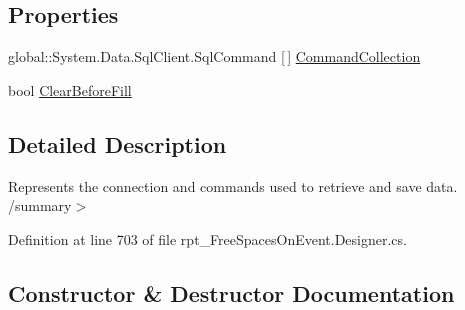 \subsection*{Properties}
\begin{DoxyCompactItemize}
\item 
global\+::\+System.\+Data.\+Sql\+Client.\+Sql\+Command \mbox{[}$\,$\mbox{]} \hyperlink{classprj_progra_i_i_i_1_1rpt___free_spaces_on_event_table_adapters_1_1rpt___free_spaces_on_event_table_adapter_aeb07de485c1ea74c03d2d044c1f8baab}{Command\+Collection}
\item 
bool \hyperlink{classprj_progra_i_i_i_1_1rpt___free_spaces_on_event_table_adapters_1_1rpt___free_spaces_on_event_table_adapter_ae1a00c339bd0fa24ace34b4b916b8c91}{Clear\+Before\+Fill}
\end{DoxyCompactItemize}


\subsection{Detailed Description}
Represents the connection and commands used to retrieve and save data. /summary$>$ 

Definition at line 703 of file rpt\+\_\+\+Free\+Spaces\+On\+Event.\+Designer.\+cs.



\subsection{Constructor \& Destructor Documentation}
\hypertarget{classprj_progra_i_i_i_1_1rpt___free_spaces_on_event_table_adapters_1_1rpt___free_spaces_on_event_table_adapter_a32a5f91416fc73ef5be530920866cb01}{}\label{classprj_progra_i_i_i_1_1rpt___free_spaces_on_event_table_adapters_1_1rpt___free_spaces_on_event_table_adapter_a32a5f91416fc73ef5be530920866cb01} 
